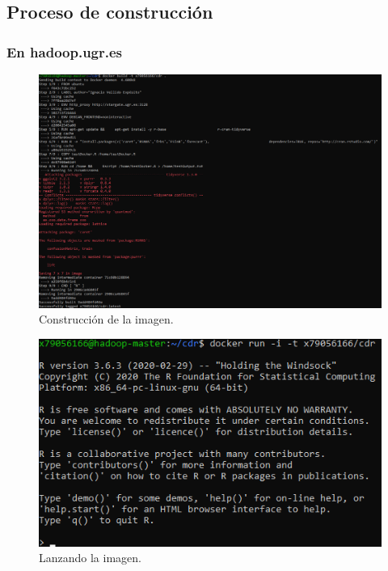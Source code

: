 \subsection{Proceso de construcción}

\subsubsection{En hadoop.ugr.es}

\begin{figure}[H]\center\includegraphics[width=.95\linewidth]{img/r/r1.png}\caption{Construcción de la imagen.}\end{figure}

\begin{figure}[H]\center\includegraphics[width=.95\linewidth]{img/r/r3.png}\caption{Lanzando la imagen.}\end{figure}


